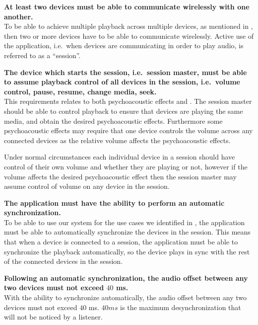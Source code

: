\begin{eletterate}
    \item\label{req:wireless} \textbf{At least two devices must be able to communicate wirelessly with one another.} \hfill\\
        To be able to achieve multiple playback across multiple devices, as mentioned in ,
        then two or more devices have to be able to communicate wirelessly.
        Active use of the application, i.e.~when devices are communicating in order to play audio, is referred to as a ``session''.

    \item\label{req:host_control} \textbf{The device which starts the session, i.e.~session master, must be able to assume playback control of all devices in the session, i.e.~volume control, pause, resume, change media, seek.} \hfill\\
        This requirements relates to both psychoacoustic effects and .
        The session master should be able to control playback to ensure that devices are playing the same media, and obtain the desired psychoacoustic effects.
        Furthermore some psychoacoustic effects may require that one device controls the volume across any connected devices as the relative volume affects the psychoacoustic effects.

        Under normal circumstances each individual device in a session should have control of their own volume and whether they are playing or not, however if the volume affects the desired psychoacoustic effect then the session master may assume control of volume on any device in the session.


    \item\label{req:sync} \textbf{The application must have the ability to perform an automatic synchronization.} \hfill\\
        To be able to use our system for the use cases we identified in ,
        the application must be able to automatically synchronize the devices in the session.
        This means that when a device is connected to a session, the application must be able to synchronize the playback automatically,
        so the device plays in sync with the rest of the connected devices in the session.

    \begin{eletterate}
        \item\label{req:auto_off} \textbf{Following an automatic synchronization, the audio offset between any two devices must not exceed $40$ ms.} \hfill\\
            With the ability to synchronize automatically, the audio offset between any two devices must not exceed $40$ ms.
            $40 ms$ is the maximum desynchronization that will not be noticed by a listener.


\end{eletterate}
\end{eletterate}
